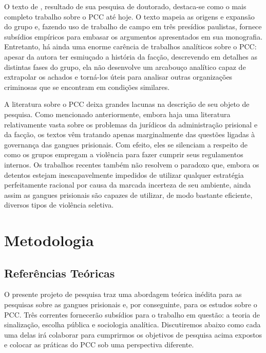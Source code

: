 \documentclass[a4paper,11pt]{article}
\begin{document}
O texto de \citet{dias2011pulverizaccao}, resultado de sua pesquisa de doutorado, destaca-se como o mais completo trabalho sobre o PCC até hoje. O texto mapeia as origens e expansão do grupo e, fazendo uso de trabalho de campo em três presídios paulistas, fornece subsídios empíricos para embasar os argumentos apresentados em sua monografia. Entretanto, há ainda uma enorme carência de trabalhos analíticos sobre o PCC: apesar da autora ter esmiuçado a história da facção, descrevendo em detalhes as distintas fases do grupo, ela não desenvolve um arcabouço analítico capaz de extrapolar os achados e torná-los úteis para analisar outras organizações criminosas que se encontram em condições similares.  

A literatura sobre o PCC deixa grandes lacunas na descrição de seu objeto de pesquisa.  Como mencionado anteriormente, embora haja uma literatura relativamente vasta sobre os problemas da jurídicos da administração prisional e da facção, os textos vêm tratando apenas marginalmente das questões ligadas à governança das gangues prisionais. Com efeito, eles se silenciam a respeito de como os grupos empregam a violência para fazer cumprir seus regulamentos internos. Os trabalhos recentes também não resolvem o paradoxo que, embora os detentos estejam inescapavelmente impedidos de utilizar qualquer estratégia perfeitamente racional por causa da marcada incerteza de seu ambiente, ainda assim as gangues prisionais são capazes de utilizar, de modo bastante eficiente, diversos tipos de violência seletiva.

\section{Metodologia}

\subsection{Referências Teóricas}

O presente projeto de pesquisa traz uma abordagem teórica inédita para as pesquisas sobre as gangues prisionais e, por conseguinte, para os estudos sobre o PCC. Três correntes fornecerão subsídios para o trabalho em questão: a teoria de sinalização, escolha pública e sociologia analítica. Discutiremos abaixo como cada uma delas irá colaborar para cumprirmos os objetivos de pesquisa acima expostos e colocar as práticas do PCC sob uma perspectiva diferente.
\end{document}
